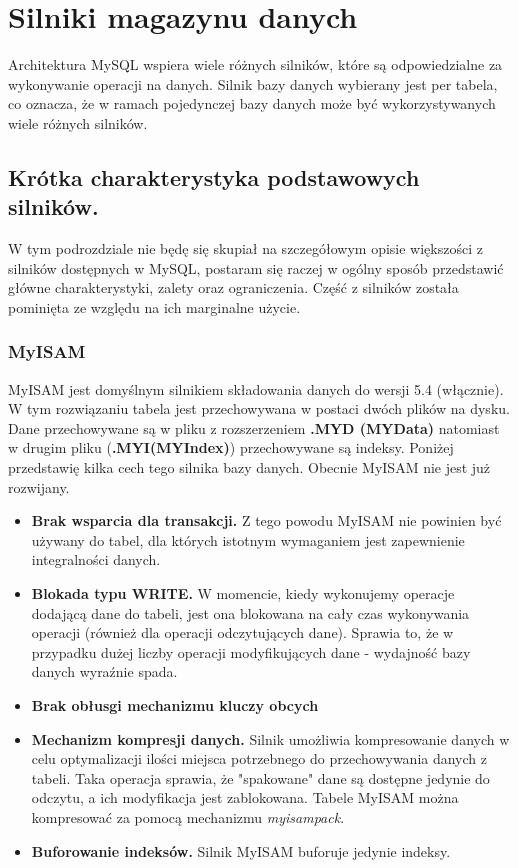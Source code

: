 \section{Silniki magazynu danych}
Architektura MySQL wspiera wiele różnych silników, które są  odpowiedzialne za wykonywanie operacji na danych. Silnik bazy danych wybierany jest per tabela, co oznacza, że w ramach pojedynczej bazy danych może być wykorzystywanych wiele różnych silników. 
\subsection{Krótka charakterystyka podstawowych silników.}
W tym podrozdziale nie będę się skupiał na szczegółowym opisie większości z silników dostępnych w MySQL, postaram się raczej w ogólny sposób przedstawić główne charakterystyki, zalety oraz ograniczenia. Część z silników została pominięta ze względu na ich marginalne użycie.
\subsubsection{MyISAM}
MyISAM jest domyślnym silnikiem składowania danych do wersji 5.4 (włącznie). W tym rozwiązaniu tabela jest przechowywana w postaci dwóch plików na dysku. Dane przechowywane są w pliku z rozszerzeniem \textbf{.MYD (MYData)}
natomiast w drugim pliku (\textbf{.MYI(MYIndex)}) przechowywane są indeksy. Poniżej przedstawię kilka cech tego silnika bazy danych. Obecnie MyISAM nie jest już rozwijany.
\begin{itemize}
	\item \textbf{Brak wsparcia dla transakcji.} Z tego powodu MyISAM nie powinien być używany do tabel, dla których istotnym wymaganiem jest zapewnienie integralności danych.
	\item \textbf{Blokada typu WRITE.}  W momencie, kiedy wykonujemy operacje dodającą dane do tabeli, jest ona blokowana na cały czas wykonywania operacji (również dla operacji odczytujących dane). Sprawia to, że w przypadku dużej liczby operacji modyfikujących dane - wydajność bazy danych wyraźnie spada.
	\item \textbf{Brak obłusgi mechanizmu kluczy obcych}
	\item \textbf{Mechanizm kompresji danych.} Silnik umożliwia kompresowanie danych w celu optymalizacji ilości miejsca potrzebnego do przechowywania danych z tabeli. Taka operacja sprawia, że "spakowane" dane są dostępne jedynie do odczytu, a ich modyfikacja jest zablokowana.	Tabele MyISAM można kompresować za pomocą mechanizmu \textit{myisampack}. 
	\item \textbf{Buforowanie indeksów.} Silnik MyISAM buforuje jedynie indeksy.
\end{itemize}


